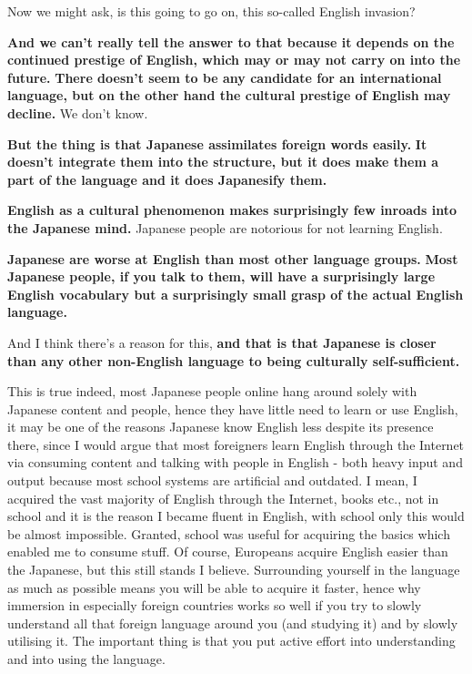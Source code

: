 \startsectionlevel[title={Will English continue invading Japanese?},reference={will-english-continue-invading-japanese}]

Now we might ask, is this going to go on, this so-called English invasion?

{}

{\bf And we can't really tell the answer to that because it depends on the continued prestige of English, which may or may not carry on into the future.} {\bf There doesn't seem to be any candidate for an international language, but on the other hand the cultural prestige of English may decline.} We don't know.

\thinrule

{\bf But the thing is that Japanese assimilates foreign words easily.} {\bf It doesn't integrate them into the structure, but it does make them a part of the language and it does Japanesify them.}

{\bf English as a cultural phenomenon makes surprisingly few inroads into the Japanese mind.} Japanese people are notorious for not learning English.

{\bf Japanese are worse at English than most other language groups.} {\bf Most Japanese people, if you talk to them, will have a surprisingly large English vocabulary but a surprisingly small grasp of the actual English language.}

\thinrule

And I think there's a reason for this, {\bf and that is that Japanese is closer than any other non-English language to being culturally self-sufficient.}

This is true indeed, most Japanese people online hang around solely with Japanese content and people, hence they have little need to learn or use English, it may be one of the reasons Japanese know English less despite its presence there, since I would argue that most foreigners learn English through the Internet via consuming content and talking with people in English - both heavy input and output because most school systems are artificial and outdated.\crlf
I mean, I acquired the vast majority of English through the Internet, books etc., not in school and it is the reason I became fluent in English, with school only this would be almost impossible.\crlf
Granted, school was useful for acquiring the basics which enabled me to consume stuff.\crlf
Of course, Europeans acquire English easier than the Japanese, but this still stands I believe.\crlf
Surrounding yourself in the language as much as possible means you will be able to acquire it faster, hence why immersion in especially foreign countries works so well if you try to slowly understand all that foreign language around you (and studying it) and by slowly utilising it.\crlf
The important thing is that you put active effort into understanding and into using the language.

